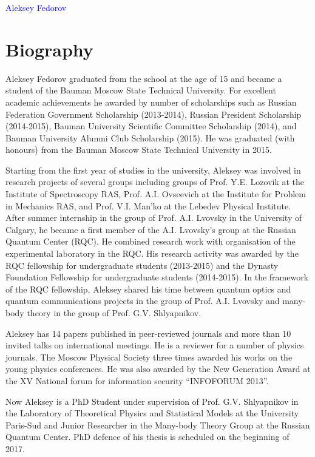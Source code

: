 \documentclass[10pt,a4paper,sans]{moderncv}
\begin{document}
\begin{center}
\Large
\textcolor{blue}{Aleksey Fedorov}
\end{center}

\section{Biography}

Aleksey Fedorov graduated from the school at the age of 15 and became a student of the Bauman Moscow State Technical University. 
For excellent academic achievements he awarded by number of scholarships such as Russian Federation Government Scholarship (2013-2014), 
Russian President Scholarship (2014-2015), Bauman University Scientific Committee Scholarship (2014), and Bauman University Alumni Club Scholarship (2015). 
He was graduated (with honours) from the Bauman Moscow State Technical University in 2015.

\medskip

Starting from the first year of studies in the university, Aleksey was involved in research projects of several groups including groups of Prof. Y.E. Lozovik at the Institute of Spectroscopy RAS, 
Prof. A.I. Ovseevich at the Institute for Problem in Mechanics RAS, and Prof. V.I. Man'ko at the Lebedev Physical Institute. 
After summer internship in the group of Prof. A.I. Lvovsky in the University of Calgary, he became a first member of the A.I. Lvovsky's group at the Russian Quantum Center (RQC). 
He combined research work with organisation of the experimental laboratory in the RQC.
His research activity was awarded by the RQC fellowship for undergraduate students (2013-2015) and the Dynasty Foundation Fellowship for undergraduate students (2014-2015).
In the framework of the RQC fellowship,
Aleksey shared his time between quantum optics and quantum communications projects in the group of Prof. A.I. Lvovsky  and many-body theory in the group of Prof. G.V. Shlyapnikov. 

\medskip

Aleksey has 14 papers published in peer-reviewed journals and more than 10 invited talks on international meetings. 
He is a reviewer for a number of physics journals.
The Moscow Physical Society three times awarded his works on the young physics conferences. 
He was also awarded by the New Generation Award at the XV National forum for information security ``INFOFORUM 2013''.

\medskip

Now Aleksey is a PhD Student under supervision of Prof. G.V. Shlyapnikov in the Laboratory of Theoretical Physics and Statistical Models at the University Paris-Sud 
and Junior Researcher in the Many-body Theory Group at the Russian Quantum Center. 
PhD defence of his thesis is scheduled on the beginning of 2017. 
\end{document}
